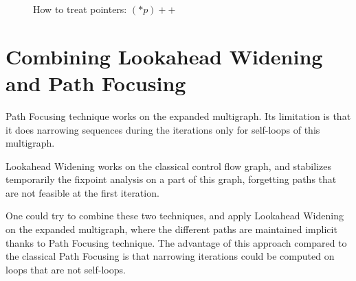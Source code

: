 \documentclass[a4paper,english,titlepage,11pt]{report}
\begin{document}
\begin{figure}[!h]
\centering
{}
\caption{How to treat pointers: $(*p)++$}
\label{pointers}
\end{figure}

	\section{Combining Lookahead Widening and Path Focusing}

	Path Focusing technique works on the expanded multigraph.
	Its limitation is that it does narrowing
	sequences during the iterations only for self-loops of this multigraph.
	
	Lookahead Widening works on the classical control flow graph, and stabilizes
	temporarily the fixpoint analysis on a part of this graph, forgetting paths
	that are not feasible at the first iteration.

	One could try to combine these two techniques, and apply Lookahead Widening
	on the expanded multigraph, where the different paths are maintained
	implicit thanks to Path Focusing technique. The advantage of this approach
	compared to the classical Path Focusing is that narrowing iterations could
	be computed on loops that are not self-loops.
\end{document}
